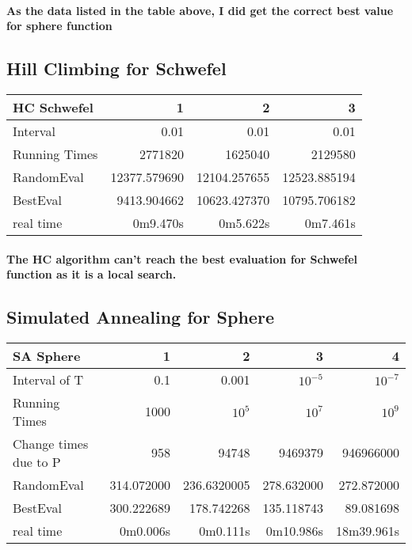 \documentclass[12pt]{article}
\begin{document}
	\paragraph{As the data listed in the table above, I did get the correct best value for sphere function}
	
	\subsection{Hill Climbing for Schwefel}
	\begin{center}
	\begin{tabular}{|l|r|r|r|}
	\hline
	\bf HC Schwefel & \bf 1 & \bf 2 & \bf 3 \\
	\hline
	Interval & 0.01 & 0.01 & 0.01 \\
	Running Times & 2771820 & 1625040 & 2129580 \\
	RandomEval & 12377.579690 & 12104.257655 & 12523.885194 \\
	BestEval & 9413.904662 & 10623.427370 & 10795.706182 \\
	real time & 0m9.470s & 0m5.622s & 0m7.461s \\
	\hline
	\end{tabular}
	\end{center}
	\paragraph{The HC algorithm can't reach the best evaluation for Schwefel function as it is a local search.}
	
	\subsection{Simulated Annealing for Sphere}
	\begin{center}
	\begin{tabular}{|l|r|r|r|r|}
	\hline
	\bf SA Sphere & \bf 1 & \bf 2 & \bf 3 & \bf 4\\
	\hline
	Interval of T & 0.1 & 0.001 & $10^{-5}$ & $10^{-7}$\\
	Running Times & 1000 & $10^5$ & $10^7$ & $10^9$\\
	Change times due to P & 958 & 94748 & 9469379 & 946966000 \\
	RandomEval & 314.072000 & 236.6320005 & 278.632000 & 272.872000 \\
	BestEval & 300.222689 & 178.742268 & 135.118743 & 89.081698\\
	real time & 0m0.006s & 0m0.111s & 0m10.986s & 18m39.961s\\
	\hline
	\end{tabular}
	\end{center}
\end{document}

